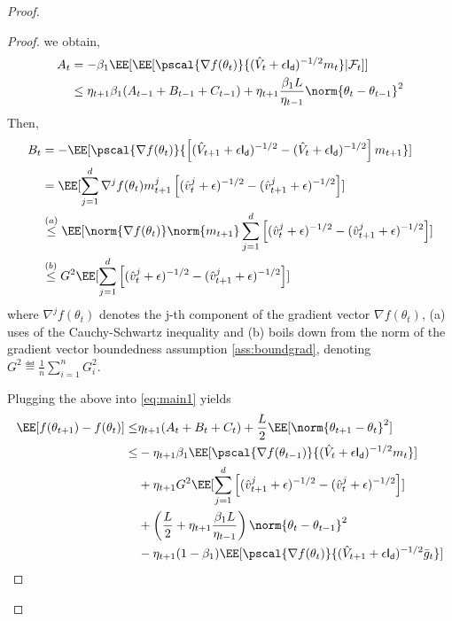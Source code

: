\documentclass[11pt]{article}
\begin{document}
\begin{proof}
\begin{proof}
we obtain,
\begin{equation}\label{eq:termA}
\begin{split}
A_t & = - \beta_1\EE[\EE[\pscal{\nabla f(\theta_t)}{(\hat{V}_{t} + \epsilon \mathsf{I_d})^{-1/2} m_{t}}| \mathcal{F}_t]]\\
&  \leq \eta_{t+1} \beta_1(A_{t-1} + B_{t-1} + C_{t-1})  + \eta_{t+1}\frac{\beta_1 L}{\eta_{t-1}} \norm{\theta_t - \theta_{t-1}}^2
\end{split}
\end{equation}
Then,
\begin{equation}\label{eq:termB}
\begin{split}
B_t & =-  \EE[\pscal{\nabla f(\theta_t)}{\left[(\hat{V}_{t+1} + \epsilon \mathsf{I_d})^{-1/2} - (\hat{V}_{t} + \epsilon \mathsf{I_d})^{-1/2}  \right]m_{t+1}}]\\
& =  \EE[\sum_{j=1}^d  \nabla^j f(\theta_t)m_{t+1}^j \left[(\hat{v}^j_{t} + \epsilon )^{-1/2} - (\hat{v}^j_{t+1} + \epsilon )^{-1/2}  \right] ]\\
& \overset{(a)}{\leq}  \EE[\norm{\nabla f(\theta_t)} \norm{m_{t+1}}\sum_{j=1}^d\left[(\hat{v}^j_{t} + \epsilon )^{-1/2} - (\hat{v}^j_{t+1} + \epsilon )^{-1/2}  \right] ]\\
& \overset{(b)}{\leq}  G^2 \EE[\sum_{j=1}^d \left[(\hat{v}^j_{t} + \epsilon )^{-1/2} - (\hat{v}^j_{t+1} + \epsilon )^{-1/2}  \right] ]
\end{split}
\end{equation}
where $\nabla^j f(\theta_t)$ denotes the j-th component of the gradient vector $\nabla f(\theta_t)$, (a) uses of the Cauchy-Schwartz inequality and (b) boils down from the norm of the gradient vector boundedness assumption \ref{ass:boundgrad}, denoting $G^2 \eqdef \frac{1}{n}\sum_{i=1}^n G_i^2$.


Plugging the above into \eqref{eq:main1} yields
\begin{equation}
\begin{split}
\EE[f(\theta_{t+1}) - f(\theta_{t}) ] \leq & \eta_{t+1}(A_t + B_t + C_t) + \frac{L}{2} \EE[\norm{\theta_{t+1} - \theta_{t}}^2]\\
 \leq &- \eta_{t+1} \beta_1\EE[\pscal{\nabla f(\theta_{t-1})}{(\hat{V}_{t} + \epsilon \mathsf{I_d})^{-1/2} m_{t}}]\\
&+   \eta_{t+1} G^2 \EE[\sum_{j=1}^d \left[(\hat{v}^j_{t+1} + \epsilon )^{-1/2} - (\hat{v}^j_{t} + \epsilon )^{-1/2}  \right] ]\\
&+  \left(\frac{L}{2} + \eta_{t+1}\frac{\beta_1 L}{\eta_{t-1}} \right) \norm{\theta_t - \theta_{t-1}}^2\\
&-   \eta_{t+1}(1-\beta_1) \EE[\pscal{\nabla f(\theta_t)}{(\hat{V}_{t+1} + \epsilon \mathsf{I_d})^{-1/2} \bar{g}_t}]
\end{split}
\end{equation}


\end{proof}
\end{proof}
\end{document}
